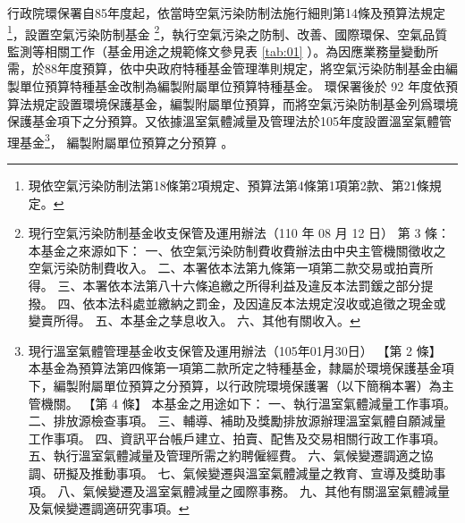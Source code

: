 \documentclass[12pt,a4paper]{article}
\begin{document}
行政院環保署自85年度起，依當時空氣污染防制法施行細則第14條及預算法規定\footnote{現依空氣污染防制法第18條第2項規定、預算法第4條第1項第2款、第21條規定。}，設置空氣污染防制基金
\footnote{
  現行空氣污染防制基金收支保管及運用辦法（110 年 08 月 12 日）
  第 3 條：
本基金之來源如下：
一、依空氣污染防制費收費辦法由中央主管機關徵收之空氣污染防制費收入。
二、本署依本法第九條第一項第二款交易或拍賣所得。
三、本署依本法第八十六條追繳之所得利益及違反本法罰鍰之部分提撥。
四、依本法科處並繳納之罰金，及因違反本法規定沒收或追徵之現金或變賣所得。
五、本基金之孳息收入。
六、其他有關收入。}，執行空氣污染之防制、改善、國際環保、空氣品質監測等相關工作（基金用途之規範條文參見表 \ref{tab:01} ）。為因應業務量變動所需，於88年度預算，依中央政府特種基金管理準則規定，將空氣污染防制基金由編製單位預算特種基金改制為編製附屬單位預算特種基金。
環保署後於 92 年度依預算法規定設置環境保護基金，編製附屬單位預算，而將空氣污染防制基金列爲環境保護基金項下之分預算。又依據溫室氣體減量及管理法於105年度設置溫室氣體管理基金\footnote{現行溫室氣體管理基金收支保管及運用辦法（105年01月30日）
【第 2 條】
本基金為預算法第四條第一項第二款所定之特種基金，隸屬於環境保護基金項下，編製附屬單位預算之分預算，以行政院環境保護署（以下簡稱本署）為主管機關。
【第 4 條】
本基金之用途如下：
一、執行溫室氣體減量工作事項。
二、排放源檢查事項。
三、輔導、補助及獎勵排放源辦理溫室氣體自願減量工作事項。
四、資訊平台帳戶建立、拍賣、配售及交易相關行政工作事項。
五、執行溫室氣體減量及管理所需之約聘僱經費。
六、氣候變遷調適之協調、研擬及推動事項。
七、氣候變遷與溫室氣體減量之教育、宣導及獎助事項。
八、氣候變遷及溫室氣體減量之國際事務。
九、其他有關溫室氣體減量及氣候變遷調適研究事項。
}，
編製附屬單位預算之分預算
。
\end{document}
